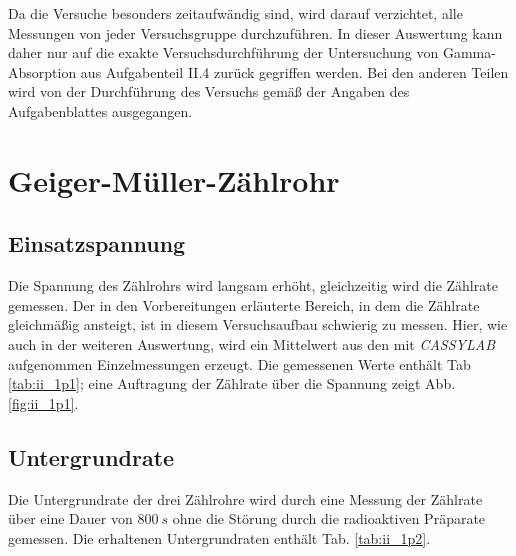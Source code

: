 Da die Versuche besonders zeitaufwändig sind, wird darauf verzichtet, alle Messungen von jeder Versuchsgruppe durchzuführen. In dieser Auswertung kann daher nur auf die exakte Versuchsdurchführung der Untersuchung von Gamma-Absorption aus Aufgabenteil II.4 zurück gegriffen werden. Bei den anderen Teilen wird von der Durchführung des Versuchs gemäß der Angaben des Aufgabenblattes ausgegangen.

\section{Geiger-Müller-Zählrohr}
\subsection{Einsatzspannung}
Die Spannung des Zählrohrs wird langsam erhöht, gleichzeitig wird die Zählrate gemessen. Der in den Vorbereitungen erläuterte Bereich, in dem die Zählrate gleichmäßig ansteigt, ist in diesem Versuchsaufbau schwierig zu messen. Hier, wie auch in der weiteren Auswertung, wird ein Mittelwert aus den mit \textit{CASSYLAB} aufgenommen Einzelmessungen erzeugt. Die gemessenen Werte enthält Tab \ref{tab:ii_1p1}; eine Auftragung der Zählrate über die Spannung zeigt Abb. \ref{fig:ii_1p1}.



\subsection{Untergrundrate}
Die Untergrundrate der drei Zählrohre wird durch eine Messung der Zählrate über eine Dauer von $\SI{800}{s}$ ohne die Störung durch die radioaktiven Präparate gemessen. Die erhaltenen Untergrundraten enthält Tab. \ref{tab:ii_1p2}.


